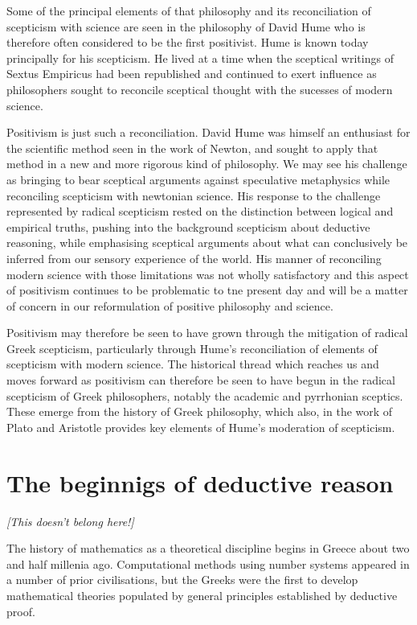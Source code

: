 Some of the principal elements of that philosophy and its reconciliation of scepticism with science
are seen in the philosophy of David Hume who is therefore often considered to be the first positivist.
Hume is known today principally for his scepticism.
He lived at a time when the sceptical writings of Sextus Empiricus had been republished
and continued to exert influence as philosophers sought to reconcile sceptical thought
with the sucesses of modern science.

Positivism is just such a reconciliation.
David Hume was himself an enthusiast for the scientific method seen in the work of Newton,
and sought to apply that method in a new and more rigorous kind of philosophy.
We may see his challenge as bringing to bear sceptical arguments against speculative
metaphysics while reconciling scepticism with newtonian science.
His response to the challenge represented by radical scepticism rested on the distinction between logical and empirical truths,
pushing into the background scepticism about deductive reasoning, while emphasising sceptical
arguments about what can conclusively be inferred from our sensory experience of the world.
His manner of reconciling modern science with those limitations was not wholly satisfactory
and this aspect of positivism continues to be problematic to tne present day and will be
a matter of concern in our reformulation of positive philosophy and science.

Positivism may therefore be seen to have grown through the mitigation of radical
Greek scepticism, particularly through Hume's reconciliation of elements of scepticism
with modern science.
The historical thread which reaches us and moves forward as positivism can
therefore be seen to have begun in the radical scepticism of Greek philosophers,
notably the academic and pyrrhonian sceptics.
These emerge from the history of Greek philosophy, which also, in the work
of Plato and Aristotle provides key elements of Hume's moderation of scepticism.

\section{The beginnigs of deductive reason}

{\it [This doesn't belong here!]}

The history of mathematics as a theoretical discipline begins in Greece about two and half millenia ago.
Computational methods using number systems appeared in a number of prior civilisations,
but the Greeks were the first to develop mathematical theories populated by general principles
established by deductive proof.

